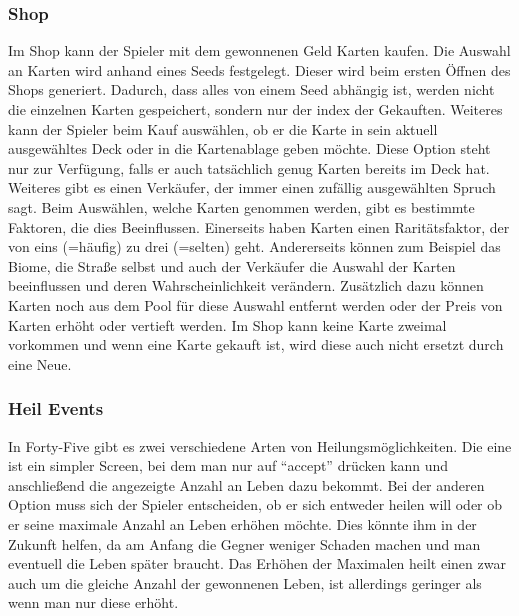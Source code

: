 \subsubsection{Shop}\label{subsubsec:shop}
Im Shop kann der Spieler mit dem gewonnenen Geld Karten kaufen.
Die Auswahl an Karten wird anhand eines Seeds festgelegt.
Dieser wird beim ersten Öffnen des Shops generiert.
Dadurch, dass alles von einem Seed abhängig ist, werden nicht die einzelnen Karten gespeichert, sondern nur der index der Gekauften.
Weiteres kann der Spieler beim Kauf auswählen, ob er die Karte in sein aktuell ausgewähltes Deck oder in die Kartenablage geben möchte.
Diese Option steht nur zur Verfügung, falls er auch tatsächlich genug Karten bereits im Deck hat.
Weiteres gibt es einen Verkäufer, der immer einen zufällig ausgewählten Spruch sagt.
Beim Auswählen, welche Karten genommen werden, gibt es bestimmte Faktoren, die dies Beeinflussen.
Einerseits haben Karten einen Raritätsfaktor, der von eins (=häufig) zu drei (=selten) geht.
Andererseits können zum Beispiel das Biome, die Straße selbst und auch der Verkäufer die Auswahl der Karten beeinflussen und deren Wahrscheinlichkeit verändern.
Zusätzlich dazu können Karten noch aus dem Pool für diese Auswahl entfernt werden oder der Preis von Karten erhöht oder vertieft werden.
Im Shop kann keine Karte zweimal vorkommen und wenn eine Karte gekauft ist, wird diese auch nicht ersetzt durch eine Neue.

\subsubsection{Heil Events}\label{subsubsec:heal-event}
In Forty-Five gibt es zwei verschiedene Arten von Heilungsmöglichkeiten.
Die eine ist ein simpler Screen, bei dem man nur auf ``accept'' drücken kann und anschließend die angezeigte Anzahl an Leben dazu bekommt.
Bei der anderen Option muss sich der Spieler entscheiden, ob er sich entweder heilen will oder ob er seine maximale Anzahl an Leben erhöhen möchte.
Dies könnte ihm in der Zukunft helfen, da am Anfang die Gegner weniger Schaden machen und man eventuell die Leben später braucht.
Das Erhöhen der Maximalen heilt einen zwar auch um die gleiche Anzahl der gewonnenen Leben, ist allerdings geringer als wenn man nur diese erhöht.


